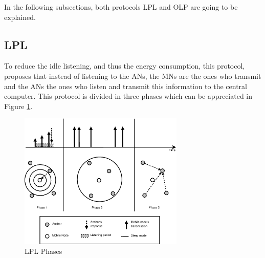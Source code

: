 In the following subsections, both protocols \ac{LPL} and \ac {OLP} are going to be explained.

\subsection{\acl{LPL}}

To reduce the idle listening, and thus the energy consumption, this protocol, proposes that instead of listening to the \acp{AN}, the
\acp{MN} are the ones who transmit and the \acp{AN} the ones who listen and transmit this information to the central computer. This protocol is 
divided in three phases which can be appreciated in Figure \ref{fig:LPL}.

\begin{figure}[ht]
 \begin{center}
  \includegraphics[width=0.7\textwidth]{LPL.eps}
 \end{center}
 \caption{LPL Phases \cite{LPLandOLP}}
 \label{fig:LPL}
\end{figure}

